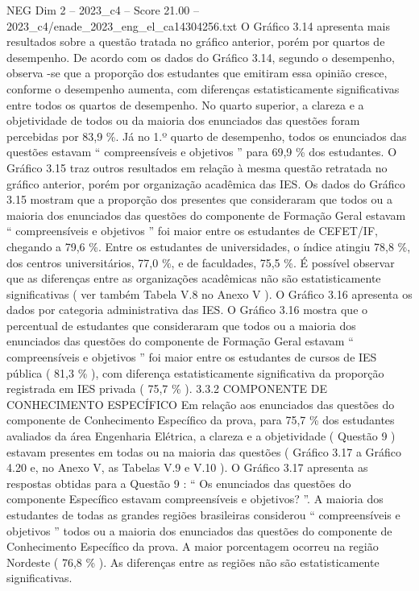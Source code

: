 \begin{textsample}{NEG Dim 2 – 2023\_c4 – Score 21.00 – 2023\_c4/enade\_2023\_eng\_el\_ca14304256.txt}
O Gráfico 3.14 apresenta mais resultados sobre a questão tratada no gráfico anterior, porém por quartos de desempenho.
De acordo com os dados do Gráfico 3.14, segundo o desempenho, observa -se que a proporção dos estudantes que emitiram essa opinião cresce, conforme o desempenho aumenta, com diferenças estatisticamente significativas entre todos os quartos de desempenho.
No quarto superior, a clareza e a objetividade de todos ou da maioria dos enunciados das questões foram percebidas por 83,9 \%.
Já no 1.º quarto de desempenho, todos os enunciados das questões estavam “ compreensíveis e objetivos ” para 69,9 \% dos estudantes.
O Gráfico 3.15 traz outros resultados em relação à mesma questão retratada no gráfico anterior, porém por organização acadêmica das IES.
Os dados do Gráfico 3.15 mostram que a proporção dos presentes que consideraram que todos ou a maioria dos enunciados das questões do componente de Formação Geral estavam “ compreensíveis e objetivos ” foi maior entre os estudantes de CEFET/IF, chegando a 79,6 \%.
Entre os estudantes de universidades, o índice atingiu 78,8 \%, dos centros universitários, 77,0 \%, e de faculdades, 75,5 \%.
É possível observar que as diferenças entre as organizações acadêmicas não são estatisticamente significativas ( ver também Tabela V.8 no Anexo V ).
O Gráfico 3.16 apresenta os dados por categoria administrativa das IES.
O Gráfico 3.16 mostra que o percentual de estudantes que consideraram que todos ou a maioria dos enunciados das questões do componente de Formação Geral estavam “ compreensíveis e objetivos ” foi maior entre os estudantes de cursos de IES pública ( 81,3 \% ), com diferença estatisticamente significativa da proporção registrada em IES privada ( 75,7 \% ). 3.3.2 COMPONENTE DE CONHECIMENTO ESPECÍFICO Em relação aos enunciados das questões do componente de Conhecimento Específico da prova, para 75,7 \% dos estudantes avaliados da área Engenharia Elétrica, a clareza e a objetividade ( Questão 9 ) estavam presentes em todas ou na maioria das questões ( Gráfico 3.17 a Gráfico 4.20 e, no Anexo V, as Tabelas V.9 e V.10 ).
O Gráfico 3.17 apresenta as respostas obtidas para a Questão 9 : “ Os enunciados das questões do componente Específico estavam compreensíveis e objetivos? ”.
A maioria dos estudantes de todas as grandes regiões brasileiras considerou “ compreensíveis e objetivos ” todos ou a maioria dos enunciados das questões do componente de Conhecimento Específico da prova.
A maior porcentagem ocorreu na região Nordeste ( 76,8 \% ).
As diferenças entre as regiões não são estatisticamente significativas.

\end{textsample}
